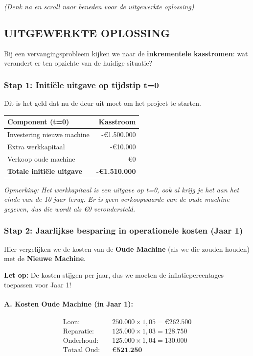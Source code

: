 \documentclass[a4paper,11pt]{article}
\begin{document}
\begin{oefenblok}[title=Investeringsanalyse — De Astrazenetech Case]
\vspace{0.3cm}
\textit{(Denk na en scroll naar beneden voor de uitgewerkte oplossing)}



    
\subsection*{UITGEWERKTE OPLOSSING}

Bij een vervangingsprobleem kijken we naar de \textbf{inkrementele kasstromen}: wat verandert er ten opzichte van de huidige situatie?

\subsubsection*{Stap 1: Initiële uitgave op tijdstip t=0}

Dit is het geld dat nu de deur uit moet om het project te starten.

\begin{center}
\begin{tabular}{|l|r|}
\hline
\textbf{Component (t=0)} & \textbf{Kasstroom} \\
\hline
Investering nieuwe machine & -€1.500.000 \\
\hline
Extra werkkapitaal & -€10.000 \\
\hline
Verkoop oude machine & €0 \\
\hline
\textbf{Totale initiële uitgave} & \textbf{-€1.510.000} \\
\hline
\end{tabular}
\end{center}

\textit{Opmerking: Het werkkapitaal is een uitgave op t=0, ook al krijg je het aan het einde van de 10 jaar terug. Er is geen verkoopwaarde van de oude machine gegeven, dus die wordt als €0 verondersteld.}

\subsubsection*{Stap 2: Jaarlijkse besparing in operationele kosten (Jaar 1)}

Hier vergelijken we de kosten van de \textbf{Oude Machine} (als we die zouden houden) met de \textbf{Nieuwe Machine}.

\textbf{Let op:} De kosten stijgen per jaar, dus we moeten de inflatiepercentages toepassen voor Jaar 1!

\paragraph{A. Kosten Oude Machine (in Jaar 1):}
\begin{align*}
\text{Loon:} \quad & 250.000 \times 1{,}05 = €262.500 \\
\text{Reparatie:} \quad & 125.000 \times 1{,}03 = 128.750 \\
\text{Onderhoud:} \quad & 125.000 \times 1{,}04 = 130.000 \\
\hline
\text{Totaal Oud:} \quad & \textbf{€521.250}
\end{align*}


\end{oefenblok}
\end{document}
